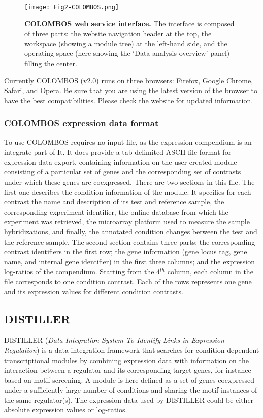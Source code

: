 \begin{figure}[tb]
	\centering
  	\texttt{[image: Fig2-COLOMBOS.png]}
	\caption[COLOMBOS web service interface]{\textbf{COLOMBOS web 
	service interface.} 
	The interface is composed of three parts: the website navigation header at 
	the top, the workspace (showing a module tree) at the left-hand side, and 
	the operating space (here showing the `Data analysis overview' panel) 
	filling the center.}
	\label{fig:colombos}
\end{figure}

Currently COLOMBOS (v2.0) runs on three browsers: Firefox, Google Chrome,
Safari, and Opera. Be sure that you are using the latest version of the browser
to have the best compatibilities. Please check the website for updated
information.

\subsubsection{COLOMBOS expression data format}\label{sec:dist-format-col}
To use COLOMBOS requires no input file, as the expression compendium is an
integrate part of It.  
%
It does provide a tab delimited ASCII file format for expression data export,
containing information on the user created module consisting of a particular set
of genes and the corresponding set of contrasts under which these genes are
coexpressed.
%
There are two sections in this file. The first one describes the condition
information of the module. It specifies for each contrast the name and
description of its test and reference sample, the corresponding experiment
identifier, the online database from which the experiment was retrieved, the
microarray platform used to measure the sample hybridizations, and finally, the
annotated condition changes between the test and the reference sample.
%
The second section contains three parts: the corresponding contrast identifiers
in the first row; the gene information (gene locus tag, gene name, and internal
gene identifier) in the first three columns; and the expression log-ratios of
the compendium.
%
Starting from the 4$^{th}$ column, each column in the file corresponds to one
condition contrast. Each of the rows represents one gene and its expression
values for different condition contrasts.


\subsection{DISTILLER}\label{sec:dist-distiller}
DISTILLER (\textit{Data Integration System To Identify Links in Expression
  Regulation}) is a data integration framework that searches for condition
dependent transcriptional modules by combining expression data with information
on the interaction between a regulator and its corresponding target genes, for
instance based on motif screening. A module is here defined as a set of genes
coexpressed under a sufficiently large number of conditions and sharing the
motif instances of the same regulator(s).  The expression data used by DISTILLER
could be either absolute expression values or log-ratios.

